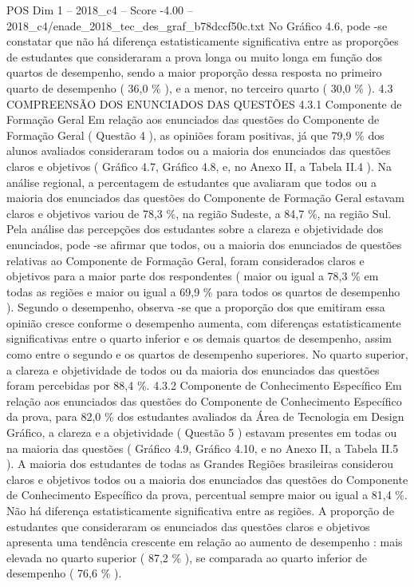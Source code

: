\begin{textsample}{POS Dim 1 – 2018\_c4 – Score -4.00 – 2018\_c4/enade\_2018\_tec\_des\_graf\_b78dccf50c.txt}
No Gráfico 4.6, pode -se constatar que não há diferença estatisticamente significativa entre as proporções de estudantes que consideraram a prova longa ou muito longa em função dos quartos de desempenho, sendo a maior proporção dessa resposta no primeiro quarto de desempenho ( 36,0 \% ), e a menor, no terceiro quarto ( 30,0 \% ). 4.3 COMPREENSÃO DOS ENUNCIADOS DAS QUESTÕES 4.3.1 Componente de Formação Geral Em relação aos enunciados das questões do Componente de Formação Geral ( Questão 4 ), as opiniões foram positivas, já que 79,9 \% dos alunos avaliados consideraram todos ou a maioria dos enunciados das questões claros e objetivos ( Gráfico 4.7, Gráfico 4.8, e, no Anexo II, a Tabela II.4 ).
Na análise regional, a percentagem de estudantes que avaliaram que todos ou a maioria dos enunciados das questões do Componente de Formação Geral estavam claros e objetivos variou de 78,3 \%, na região Sudeste, a 84,7 \%, na região Sul.
Pela análise das percepções dos estudantes sobre a clareza e objetividade dos enunciados, pode -se afirmar que todos, ou a maioria dos enunciados de questões relativas ao Componente de Formação Geral, foram considerados claros e objetivos para a maior parte dos respondentes ( maior ou igual a 78,3 \% em todas as regiões e maior ou igual a 69,9 \% para todos os quartos de desempenho ).
Segundo o desempenho, observa -se que a proporção dos que emitiram essa opinião cresce conforme o desempenho aumenta, com diferenças estatisticamente significativas entre o quarto inferior e os demais quartos de desempenho, assim como entre o segundo e os quartos de desempenho superiores.
No quarto superior, a clareza e objetividade de todos ou da maioria dos enunciados das questões foram percebidas por 88,4 \%. 4.3.2 Componente de Conhecimento Específico Em relação aos enunciados das questões do Componente de Conhecimento Específico da prova, para 82,0 \% dos estudantes avaliados da Área de Tecnologia em Design Gráfico, a clareza e a objetividade ( Questão 5 ) estavam presentes em todas ou na maioria das questões ( Gráfico 4.9, Gráfico 4.10, e no Anexo II, a Tabela II.5 ).
A maioria dos estudantes de todas as Grandes Regiões brasileiras considerou claros e objetivos todos ou a maioria dos enunciados das questões do Componente de Conhecimento Específico da prova, percentual sempre maior ou igual a 81,4 \%.
Não há diferença estatisticamente significativa entre as regiões.
A proporção de estudantes que consideraram os enunciados das questões claros e objetivos apresenta uma tendência crescente em relação ao aumento de desempenho : mais elevada no quarto superior ( 87,2 \% ), se comparada ao quarto inferior de desempenho ( 76,6 \% ).

\end{textsample}

